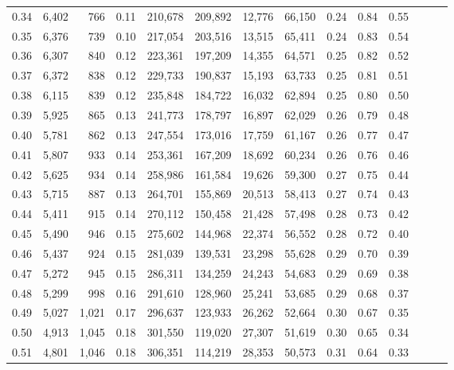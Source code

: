 \begin{tabular}{rrrrrrrrrrrrrr}
0.34 &   6,402 &    766 &  0.11 &  210,678 &  209,892 &  12,776 &  66,150 &  0.24 &  0.84 &      0.55 \\
0.35 &   6,376 &    739 &  0.10 &  217,054 &  203,516 &  13,515 &  65,411 &  0.24 &  0.83 &      0.54 \\
0.36 &   6,307 &    840 &  0.12 &  223,361 &  197,209 &  14,355 &  64,571 &  0.25 &  0.82 &      0.52 \\
0.37 &   6,372 &    838 &  0.12 &  229,733 &  190,837 &  15,193 &  63,733 &  0.25 &  0.81 &      0.51 \\
0.38 &   6,115 &    839 &  0.12 &  235,848 &  184,722 &  16,032 &  62,894 &  0.25 &  0.80 &      0.50 \\
0.39 &   5,925 &    865 &  0.13 &  241,773 &  178,797 &  16,897 &  62,029 &  0.26 &  0.79 &      0.48 \\
0.40 &   5,781 &    862 &  0.13 &  247,554 &  173,016 &  17,759 &  61,167 &  0.26 &  0.77 &      0.47 \\
0.41 &   5,807 &    933 &  0.14 &  253,361 &  167,209 &  18,692 &  60,234 &  0.26 &  0.76 &      0.46 \\
0.42 &   5,625 &    934 &  0.14 &  258,986 &  161,584 &  19,626 &  59,300 &  0.27 &  0.75 &      0.44 \\
0.43 &   5,715 &    887 &  0.13 &  264,701 &  155,869 &  20,513 &  58,413 &  0.27 &  0.74 &      0.43 \\
0.44 &   5,411 &    915 &  0.14 &  270,112 &  150,458 &  21,428 &  57,498 &  0.28 &  0.73 &      0.42 \\
0.45 &   5,490 &    946 &  0.15 &  275,602 &  144,968 &  22,374 &  56,552 &  0.28 &  0.72 &      0.40 \\
0.46 &   5,437 &    924 &  0.15 &  281,039 &  139,531 &  23,298 &  55,628 &  0.29 &  0.70 &      0.39 \\
0.47 &   5,272 &    945 &  0.15 &  286,311 &  134,259 &  24,243 &  54,683 &  0.29 &  0.69 &      0.38 \\
0.48 &   5,299 &    998 &  0.16 &  291,610 &  128,960 &  25,241 &  53,685 &  0.29 &  0.68 &      0.37 \\
0.49 &   5,027 &  1,021 &  0.17 &  296,637 &  123,933 &  26,262 &  52,664 &  0.30 &  0.67 &      0.35 \\
0.50 &   4,913 &  1,045 &  0.18 &  301,550 &  119,020 &  27,307 &  51,619 &  0.30 &  0.65 &      0.34 \\
0.51 &   4,801 &  1,046 &  0.18 &  306,351 &  114,219 &  28,353 &  50,573 &  0.31 &  0.64 &      0.33 \\

\end{tabular}
